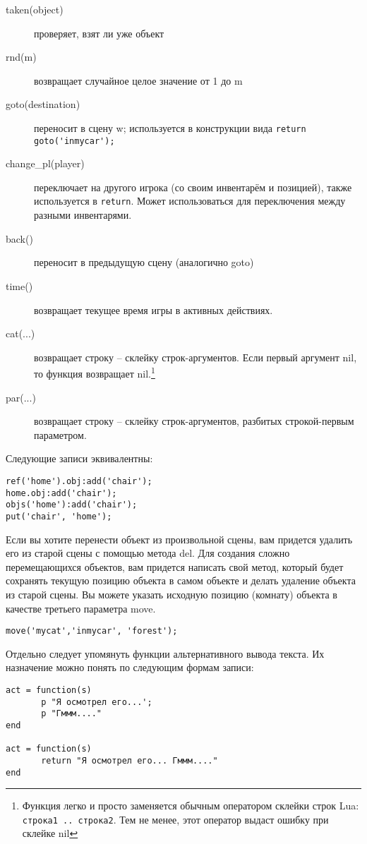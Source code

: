 \documentclass[a4paper,12pt]{article}
\begin{document}
\begin{description}
\item[taken(object)] проверяет, взят ли уже объект
\item[rnd(m)] возвращает случайное целое значение от 1 до m
\item[goto(destination)] переносит в сцену w; используется в конструкции вида \verb/return goto('inmycar');/
\item[change\_pl(player)] переключает на другого игрока (со своим инвентарём и позицией), также используется в \verb/return/. Может использоваться для переключения между разными инвентарями.
\item[back()] переносит в предыдущую сцену (аналогично goto)
\item[time()] возвращает текущее время игры в активных действиях.
\item[cat(...)] возвращает строку -- склейку строк-аргументов. Если первый аргумент nil, то функция возвращает nil.\footnote{Функция легко и просто заменяется обычным оператором склейки строк Lua: \texttt{строка1 .. строка2}. Тем не менее, этот оператор выдаст ошибку при склейке nil}
\item[par(...)] возвращает строку -- склейку строк-аргументов, разбитых строкой-первым параметром.
\end{description}

Следующие записи эквивалентны:

\begin{verbatim}
ref('home').obj:add('chair');
home.obj:add('chair');
objs('home'):add('chair');
put('chair', 'home');
\end{verbatim}

Если вы хотите перенести объект из произвольной сцены, вам придется удалить его из старой сцены с помощью метода del. Для создания сложно перемещающихся объектов, вам придется написать свой метод, который будет сохранять текущую позицию объекта в самом объекте и делать удаление объекта из старой сцены. Вы можете указать исходную позицию (комнату) объекта в качестве третьего параметра move.

\begin{verbatim}
move('mycat','inmycar', 'forest');
\end{verbatim}


Отдельно следует упомянуть функции альтернативного вывода текста. Их назначение можно понять по следующим формам записи:

\begin{verbatim}
act = function(s)
       p "Я осмотрел его...';
       p "Гммм...."
end

act = function(s)
       return "Я осмотрел его... Гммм...."
end
\end{verbatim}
\end{document}
